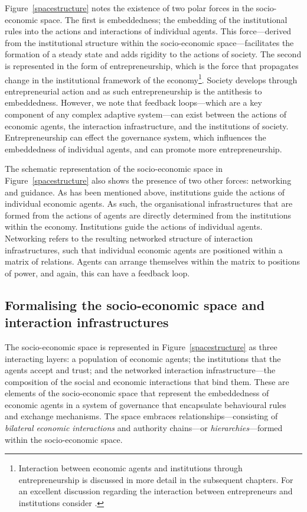 Figure~\ref{spacestructure} notes the existence of two polar forces in the socio-economic space. The first is embeddedness; the embedding of the institutional rules into the actions and interactions of individual agents. This force---derived from the institutional structure within the socio-economic space---facilitates the formation of a steady state and adds rigidity to the actions of society. The second is represented in the form of entrepreneurship, which is the force that propagates change in the institutional framework of the economy\footnote{Interaction between economic agents and institutions through entrepreneurship is discussed in more detail in the subsequent chapters. For an excellent discussion regarding the interaction between entrepreneurs and institutions consider \citet{HenreksonSanandaji2011}.}. Society develops through entrepreneurial action and as such entrepreneurship is the antithesis to embeddedness. However, we note that feedback loops---which are a key component of any complex adaptive system---can exist between the actions of economic agents, the interaction infrastructure, and the institutions of society. Entrepreneurship can effect the governance system, which influences the embeddedness of individual agents, and can promote more entrepreneurship.

The schematic representation of the socio-economic space in Figure~\ref{spacestructure} also shows the presence of two other forces: networking and guidance. As has been mentioned above, institutions guide the actions of individual economic agents. As such, the organisational infrastructures that are formed from the actions of agents are directly determined from the institutions within the economy. Institutions guide the actions of individual agents. Networking refers to the resulting networked structure of interaction infrastructures, such that individual economic agents are positioned within a matrix of relations. Agents can arrange themselves within the matrix to positions of power, and again, this can have a feedback loop.

\subsection{Formalising the socio-economic space and interaction infrastructures}

The socio-economic space is represented in Figure~\ref{spacestructure} as three interacting layers: a population of economic agents; the institutions that the agents accept and trust; and the networked interaction infrastructure---the composition of the social and economic interactions that bind them. These are elements of the socio-economic space that represent the embeddedness of economic agents in a system of governance that encapsulate behavioural rules and exchange mechanisms. The space embraces relationships---consisting of \emph{bilateral economic interactions} and authority chains---or \emph{hierarchies}---formed within the socio-economic space.

